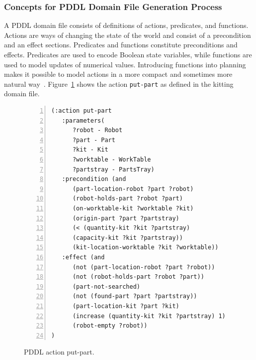 \subsubsection{Concepts for PDDL Domain File Generation Process}\label{sss:domainfile}
A PDDL domain file consists of definitions of actions, predicates, and functions. Actions are ways of changing the state of the world and consist of a precondition and an effect sections. Predicates and functions constitute preconditions and effects. Predicates are used to encode Boolean state variables, while functions are used to model updates of numerical values. Introducing functions into planning makes it possible to model actions in a more compact and sometimes more natural way~\cite{FOX.JAIR.2003}. Figure~\ref{fig:put-part} shows the action \texttt{put-part} as defined in the kitting domain file.

\begin{figure}[t!h!]
\begin{minipage}{.5\paperwidth}
\begin{list}{}{\setlength{\leftmargin}{1em}}\item\small
\begin{Verbatim}[commandchars=\\\{\},fontsize=\scriptsize, numbers=left, numbersep=2pt]
(:action put-part
   :parameters(
      ?robot - Robot
      ?part - Part
      ?kit - Kit
      ?worktable - WorkTable
      ?partstray - PartsTray)
   :precondition (and
      (part-location-robot ?part ?robot)
      (robot-holds-part ?robot ?part)
      (on-worktable-kit ?worktable ?kit)
      (origin-part ?part ?partstray)
      (< (quantity-kit ?kit ?partstray)
      (capacity-kit ?kit ?partstray))
      (kit-location-worktable ?kit ?worktable))
   :effect (and
      (not (part-location-robot ?part ?robot))
      (not (robot-holds-part ?robot ?part))
      (part-not-searched)
      (not (found-part ?part ?partstray))
      (part-location-kit ?part ?kit)
      (increase (quantity-kit ?kit ?partstray) 1)
      (robot-empty ?robot))
)
\end{Verbatim}
\end{list}
\end{minipage}
\caption{PDDL action put-part.}
\label{fig:put-part}
\end{figure}

